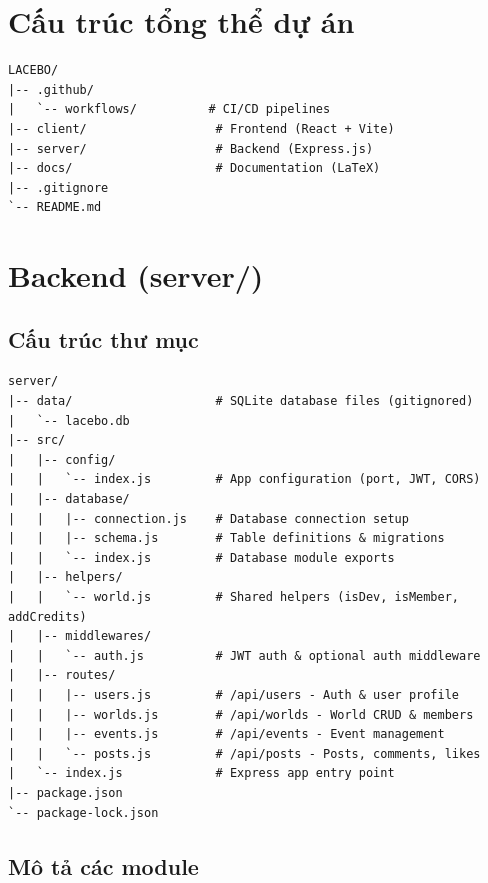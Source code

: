 \documentclass[12pt,a4paper]{article}
\begin{document}
\section{Cấu trúc tổng thể dự án}

\begin{lstlisting}[title={\textbf{LACEBO/ (Root)}}]
LACEBO/
|-- .github/
|   `-- workflows/          # CI/CD pipelines
|-- client/                  # Frontend (React + Vite)
|-- server/                  # Backend (Express.js)
|-- docs/                    # Documentation (LaTeX)
|-- .gitignore
`-- README.md
\end{lstlisting}

\section{Backend (server/)}

\subsection{Cấu trúc thư mục}

\begin{lstlisting}[title={\textbf{server/}}]
server/
|-- data/                    # SQLite database files (gitignored)
|   `-- lacebo.db
|-- src/
|   |-- config/
|   |   `-- index.js         # App configuration (port, JWT, CORS)
|   |-- database/
|   |   |-- connection.js    # Database connection setup
|   |   |-- schema.js        # Table definitions & migrations
|   |   `-- index.js         # Database module exports
|   |-- helpers/
|   |   `-- world.js         # Shared helpers (isDev, isMember, addCredits)
|   |-- middlewares/
|   |   `-- auth.js          # JWT auth & optional auth middleware
|   |-- routes/
|   |   |-- users.js         # /api/users - Auth & user profile
|   |   |-- worlds.js        # /api/worlds - World CRUD & members
|   |   |-- events.js        # /api/events - Event management
|   |   `-- posts.js         # /api/posts - Posts, comments, likes
|   `-- index.js             # Express app entry point
|-- package.json
`-- package-lock.json
\end{lstlisting}

\subsection{Mô tả các module}
\end{document}
